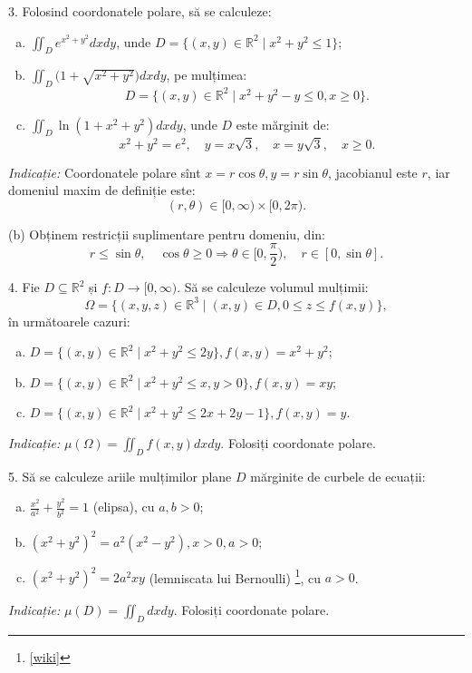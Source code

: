 \documentclass[11pt,a4paper]{article}
\newcommand\ds{\displaystyle}
\newcommand\seq{\subseteq}
\newcommand\RR{\mathbb{R}}
\theoremstyle{dotless}
\theoremstyle{dotlessdr}
\begin{document}
\vspace{1cm}

3. Folosind coordonatele polare, să se calculeze:
\begin{enumerate}[(a)]
\item $\ds\iint_D e^{x^2 + y^2} dx dy$, unde $D = \{(x, y) \in \RR^2 \mid x^2 + y^2 \leq 1 \}$;
\item $\ds\iint_D \big( 1 + \sqrt{x^2 + y^2} \big) dx dy$, pe mulțimea:
  \[
    D = \{(x, y) \in \RR^2 \mid x^2 + y^2 - y \leq 0, x \geq 0\}.
  \]
\item $\ds\iint_D \ln(1 + x^2 + y^2) dx dy$, unde $D$ este mărginit de:
  \[
    x^2 + y^2 = e^2, \quad y = x \sqrt{3}, \quad x = y\sqrt{3}, \quad x \geq 0.
  \]
\end{enumerate}

\emph{Indicație:} Coordonatele polare sînt $x = r \cos \theta, y = r \sin \theta$,
jacobianul este $r$, iar domeniul maxim de definiție este:
\[
  (r, \theta) \in [0, \infty) \times [0, 2\pi).
\]

(b) Obținem restricții suplimentare pentru domeniu, din:
\[
  r \leq \sin \theta, \quad \cos \theta \geq 0 \Rightarrow %
  \theta \in \big[0, \frac{\pi}{2}\big), \quad r \in [0, \sin \theta].
\]

\vspace{1cm}

4. Fie $D \seq \RR^2$ și $f : D \to [0, \infty)$. Să se calculeze volumul
mulțimii:
\[
  \Omega = \{(x, y, z) \in \RR^3 \mid (x, y) \in D, 0 \leq z \leq f(x, y) \},
\]
în următoarele cazuri:
\begin{enumerate}[(a)]
\item $D = \{(x, y) \in \RR^2 \mid x^2 + y^2 \leq 2y \}, f(x, y) = x^2 + y^2$;
\item $D = \{(x, y) \in \RR^2 \mid x^2 + y^2 \leq x, y > 0 \}, f(x, y) = xy$;
\item $D = \{(x, y) \in \RR^2 \mid x^2 + y^2 \leq 2x + 2y - 1 \}, f(x, y) = y$.
\end{enumerate}

\emph{Indicație:} $\mu(\Omega) = \ds\iint_D f(x, y) dx dy$. Folosiți coordonate polare.

\vspace{1cm}

5. Să se calculeze ariile mulțimilor plane $D$ mărginite de curbele de ecuații:
\begin{enumerate}[(a)]
\item $\frac{x^2}{a^2} + \frac{y^2}{b^2} = 1$ (elipsa), cu $a, b > 0$;
\item $(x^2 + y^2)^2 = a^2(x^2 - y^2), x > 0, a > 0$;
\item $(x^2 + y^2)^2 = 2a^2 xy$ (lemniscata lui Bernoulli) \footnote{\color{blue} \href{https://en.wikipedia.org/wiki/Lemniscate_of_Bernoulli}{[wiki]}},
  cu $a > 0$.
\end{enumerate}

\emph{Indicație:} $\mu(D) = \ds\iint_D dx dy$. Folosiți coordonate polare.
\end{document}
